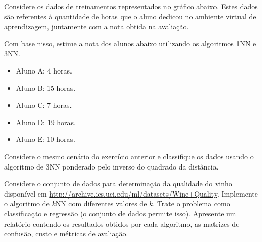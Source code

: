 \begin{exercise}
Considere os dados de treinamentos representados no gráfico abaixo. Estes dados são referentes à quantidade de horas que o aluno dedicou no ambiente virtual de aprendizagem, juntamente com a nota obtida na avaliação.

\begin{figure}[H]
	\centering
	
\end{figure}

Com base nisso, estime a nota dos alunos abaixo utilizando os algoritmos 1NN e 3NN.
\begin{itemize}
	\item Aluno A: 4 horas.
	\item Aluno B: 15 horas.
	\item Aluno C: 7 horas.
	\item Aluno D: 19 horas.
	\item Aluno E: 10 horas.
\end{itemize}
\end{exercise}

\begin{exercise}
Considere o mesmo cenário do exercício anterior e classifique os dados usando o algoritmo de 3NN ponderado pelo inverso do quadrado da distância.
\end{exercise}

\begin{exercise}
Considere o conjunto de dados para determinação da qualidade do vinho disponível em \url{http://archive.ics.uci.edu/ml/datasets/Wine+Quality}. Implemente o algoritmo de $k$NN com diferentes valores de $k$. Trate o problema como classificação e regressão (o conjunto de dados permite isso). Apresente um relatório contendo os resultados obtidos por cada algoritmo, as matrizes de confusão, custo e métricas de avaliação.
\end{exercise}

